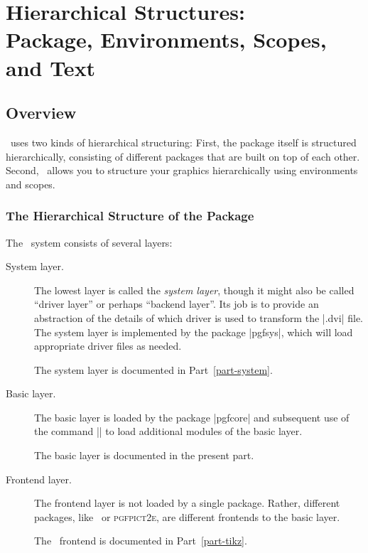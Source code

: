 %
%
%


\section[Hierarchical Structures: Package, Environments, Scopes, and Text]
        {Hierarchical Structures:\\
         Package, Environments, Scopes, and Text}

\subsection{Overview}

\pgfname\ uses two kinds of hierarchical structuring: First, the package itself
is structured hierarchically, consisting of different packages that are built
on top of each other. Second, \pgfname\ allows you to structure your graphics
hierarchically using environments and scopes.


\subsubsection{The Hierarchical Structure of the Package}

The \pgfname\ system consists of several layers:
%
\begin{description}
    \item[System layer.]
        The lowest layer is called the \emph{system layer}, though it might
        also be called ``driver layer'' or perhaps ``backend layer''. Its job
        is to provide an abstraction of the details of which driver is used to
        transform the |.dvi| file. The system layer is implemented by the
        package |pgfsys|, which will load appropriate driver files as needed.

        The system layer is documented in Part~\ref{part-system}.
    \item[Basic layer.]
        The basic layer is loaded by the package |pgfcore| and subsequent use
        of the command |\usepgfmodule| to load additional modules of the basic
        layer.

        The basic layer is documented in the present part.
    \item[Frontend layer.]
        The frontend layer is not loaded by a single package. Rather, different
        packages, like \tikzname\ or \textsc{pgfpict2e}, are different
        frontends to the basic layer.

        The \tikzname\ frontend is documented in Part~\ref{part-tikz}.
\end{description}

